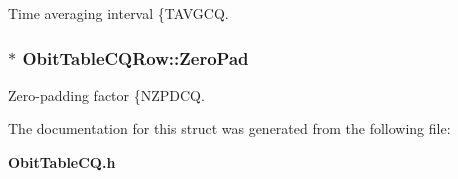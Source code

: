 Time averaging interval \{TAVGCQ. 

\subsubsection{$\ast$ {\bf Obit\-Table\-CQRow::Zero\-Pad}}\label{structObitTableCQRow_o15}


Zero-padding factor \{NZPDCQ. 



The documentation for this struct was generated from the following file:\begin{CompactItemize}
\item 
{\bf Obit\-Table\-CQ.h}\end{CompactItemize}
